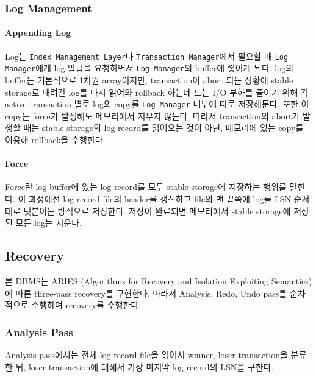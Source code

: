 \documentclass[main.tex]{subfiles}
\begin{document}
\subsubsection{Log Management}
\paragraph{Appending Log}
Log는 \texttt{Index Management Layer}나 \texttt{Transaction Manager}에서 필요할 때 \texttt{Log Manager}에게 log 발급을 요청하면서 \texttt{Log Manager}의 buffer에 쌓이게 된다.
log의 buffer는 기본적으로 1차원 array이지만, transaction이 abort 되는 상황에 stable storage로 내려간 log를 다시 읽어와 rollback 하는데 드는 I/O 부하를 줄이기 위해
각 active transaction 별로 log의 copy를 \texttt{Log Manager} 내부에 따로 저장해둔다. 또한 이 copy는 force가 발생해도 메모리에서 지우지 않는다.
따라서 transaction의 abort가 발생할 때는 stable storage의 log record를 읽어오는 것이 아닌, 메모리에 있는 copy를 이용해 rollback을 수행한다.

\paragraph{Force}
Force란 log buffer에 있는 log record를 모두 stable storage에 저장하는 행위를 말한다.
이 과정에선 log record file의 header를 갱신하고 file의 맨 끝쪽에 log를 LSN 순서대로 덧붙이는 방식으로 저장한다.
저장이 완료되면 메모리에서 stable storage에 저장된 모든 log는 지운다.

\subsection{Recovery}
본 DBMS는 ARIES (Algorithms for Recovery and Isolation Exploiting Semantics)에 따른 three-pass recovery를 구현한다.
따라서 Analysis, Redo, Undo pass를 순차적으로 수행하며 recovery를 수행한다.

\newpage
\subsubsection{Analysis Pass}
Analysis pass에서는 전체 log record file을 읽어서 winner, loser transaction을 분류한 뒤, loser transaction에 대해서 가장 마지막 log record의 LSN을 구한다.
\end{document}
